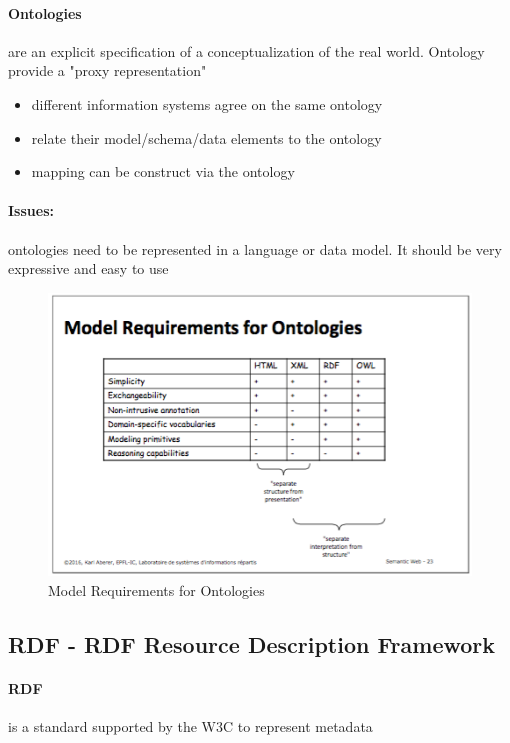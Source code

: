 \paragraph{Ontologies} are an explicit specification of a conceptualization of the real world. Ontology provide a "proxy representation"

\begin{itemize}
	\item different information systems agree on the same ontology
	\item relate their model/schema/data elements to the ontology
	\item mapping can be construct via the ontology
\end{itemize} 

\paragraph{Issues:} ontologies need to be represented in a language or data model. It should be very expressive and easy to use

\begin{figure}[H]
\begin{center}
\includegraphics[width=1\linewidth]{figures/ontology.png}
\end{center}
\caption{Model Requirements for Ontologies}
\end{figure}


\subsection{RDF - RDF Resource Description Framework}

\paragraph{RDF} is a standard supported by the W3C to represent metadata

